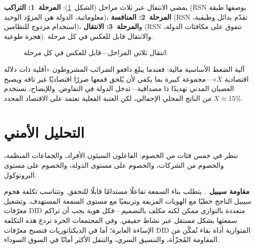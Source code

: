 \documentclass[11pt,a4paper,twocolumn]{article}
\begin{document}
يمضي الانتقال عبر ثلاث مراحل (الشكل~\ref{fig:migration}): \textbf{المرحلة~1: التراكب} (RSN بوصفها طبقة معلوماتية، الدولة هي المزوّد الوحيد)، \textbf{المرحلة~2: المنافسة} (RSN تقدّم بدائل وظيفية، استخدام مزدوج للنظامين)، و\textbf{المرحلة~3: الانتقال} (RSN تتفوق على مكافئات الدولة، هجرة طوعية). والانتقال قابل للعكس في كل مرحلة.

\begin{figure}[ht]
\centering
{}
\caption{انتقال ثلاثي المراحل---قابل للعكس في كل مرحلة.}
\label{fig:migration}
\end{figure}

آلية الضغط الأساسية مالية: فعندما يبلغ دافعو الضرائب المشروطون «أقلية ذات دلالة اقتصادية $X$»---مجموعة كبيرة بما يكفي لأن يُلحق قمعها ضررًا اقتصاديًا غير تافه ويصبح العصيان المدني تهديدًا ذا مصداقية---تدخل الدولة في التفاوض. وللإيضاح، نستخدم $X \approx 15\%$ من الناتج المحلي الإجمالي، لكن العتبة الفعلية تعتمد على الاقتصاد المحدد.

\section{التحليل الأمني}

ننظر في خمس فئات من الخصوم: الفاعلون السيئون الأفراد، والجماعات المنظمة، والخصوم من الشركات، والخصوم على مستوى الدولة، والخصوم على مستوى البروتوكول.

\textbf{مقاومة سيبيل}~\cite{douceur2002}. يتطلب بناء السمعة تفاعلًا مستدامًا قابلًا للتحقق. وتتناسب تكلفة هجوم سيبيل الناجح خطيًا مع الهويات المزيفة وتربيعيًا مع مستوى السمعة المستهدف. وتشغيل معرّفات DID متعددة بالتوازي ممكن لكنه مكلف بالتصميم---فكل هوية يجب أن تراكم سمعتها بشكل مستقل عبر نشاط حقيقي. وفي المجتمعات الحرة تردع هذه التكلفة الإساءة العابرة؛ أما في الديكتاتوريات فتصبح معرّفات DID المتوازية أداة بقاء تُمكّن من المقاومة المُجزّأة، والتنسيق السري، والتنقل الأكثر أمانًا في السوق السوداء.
\end{document}
